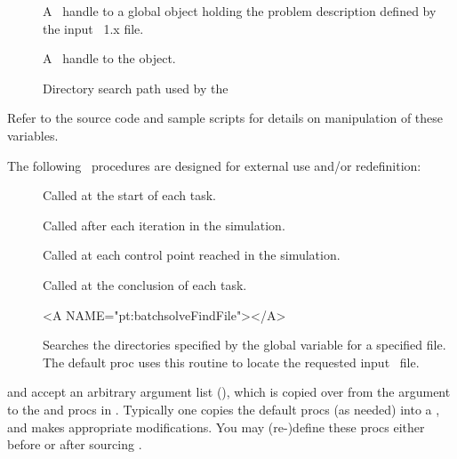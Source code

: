 {}
\begin{description}
\item[] A \Tcl\ handle to a global  
  object holding the problem description defined by the input
  \MIF~1.x file.
\item[] A \Tcl\ handle to the  object.
\item[] Directory search path used by the
\end{description}
Refer to the source code and sample scripts for details on manipulation
of these variables.

{}\label{sec:batchsolveprocs}
The following \Tcl\ procedures are designed for external use and/or
redefinition:
\begin{description}
\item[]
   Called at the start of each task.
\item[]
   Called after each iteration in the simulation.
\item[]
   Called at each control point reached in the simulation.
\item[]
   Called at the conclusion of each task.
\begin{rawhtml}
<A NAME="pt:batchsolveFindFile"></A>
\end{rawhtml}
\item[]
   Searches the directories specified by the global variable
    for a specified file.  The default
    proc uses this routine to locate the requested
   input \MIF\ file.
\end{description}
 and  accept an arbitrary
argument list (), which is copied over from the 
argument to the  and  procs in
.  Typically one copies the default procs (as needed)
into a , and makes appropriate
modifications.  You may (re-)define these procs either before or after
sourcing .

